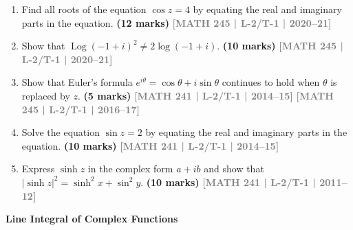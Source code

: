 \documentclass[12pt,a3paper]{article}
\newcommand{\yr}[1]{\hfill\textcolor{gray}{\small\textbf{[#1]}}}
\newcommand{\mk}[1]{\textcolor{orange!70!black}{\small\textbf{(#1 marks)}}}
\newcommand{\subtopic}[2]{%
  \vspace{10pt}
  \noindent\begin{tcolorbox}[colback=#1!8,colframe=#1,boxrule=0.6pt,arc=4pt,
    left=6pt,right=6pt,top=4pt,bottom=4pt]
    \small\bfseries\textcolor{#1}{#2}
  \end{tcolorbox}
  \vspace{2pt}
}
\begin{document}
\begin{enumerate}
  \item Find all roots of the equation $\cos z = 4$ by equating the real and imaginary parts in the equation.
\mk{12} \yr{MATH 245 | L-2/T-1 | 2020--21}


\item Show that $\operatorname{Log}(-1+i)^{2} \neq 2\log(-1+i)$.
\mk{10} \yr{MATH 245 | L-2/T-1 | 2020--21}


\item Show that Euler's formula $e^{i\theta}=\cos \theta+i\sin \theta$ continues to hold when $\theta$ is replaced by $z$.
\mk{5} \yr{MATH 241 | L-2/T-1 | 2014--15} \yr{MATH 245 | L-2/T-1 | 2016--17}



\item Solve the equation $\sin z = 2$ by equating the real and imaginary parts in the equation.
\mk{10} \yr{MATH 241 | L-2/T-1 | 2014--15}


\item Express $\sinh z$ in the complex form $a+ib$ and show that $|\sinh z|^{2}=\sinh^{2}x+\sin^{2}y$.
\mk{10} \yr{MATH 241 | L-2/T-1 | 2011--12}


\end{enumerate}

\subtopic{cE}{Line Integral of Complex Functions}
\label{sub:s5-lineint}
\end{document}
